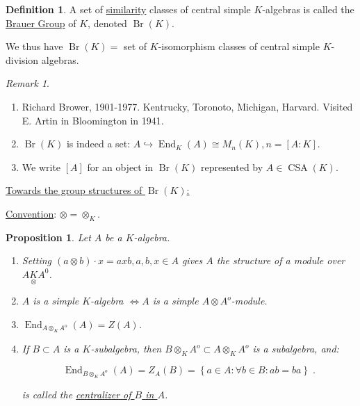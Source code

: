 \documentclass{article}
\theoremstyle{definition}
\newtheorem*{definition}{Definition}
\theoremstyle{plain}
\newtheorem{proposition}[theorem]{Proposition}
\theoremstyle{remark}
\newtheorem*{remark*}{Remark}
\begin{document}
    \begin{definition}
        A set of \underline{similarity} classes of central simple \(K\)-algebras is called the \underline{Brauer Group} of \(K\), denoted \(\operatorname{Br}(K)\).
    \end{definition}

    We thus have \(\operatorname{Br}(K) =\) set of \(K\)-isomorphism classes of central simple \(K\)-division algebras.

    \begin{remark*}

        \begin{enumerate}[label=\arabic*)]
            \item  Richard Brower, 1901-1977. Kentrucky, Toronoto, Michigan, Harvard. Visited E. Artin in Bloomington in 1941.
            \item \(\operatorname{Br}(K)\) is indeed a set: \(A \hookrightarrow \operatorname{End}_K(A) \cong M_n(K), n = [A:K]\).
            \item We write \([A]\) for an object in \(\operatorname{Br}(K)\) represented by \(A\in \operatorname{CSA}(K)\).
        \end{enumerate} 

    \end{remark*}

    \underline{Towards the group structures of \(\operatorname{Br}(K)\):}

    \underline{Convention}: \(\otimes = \otimes_K\).

    \begin{proposition}
        Let \(A\) be a \(K\)-algebra.

        \begin{enumerate}[label=\roman*)]
            \item Setting \((a \otimes b) \cdot x = axb, a,b,x\in A\) gives \(A\) the structure of a module over \(A \underset{\otimes}{K} A^0\).
            \item \(A\) is a simple \(K\)-algebra \(\iff A\) is a simple \(A \otimes A^o\)-module.
            \item \(\operatorname{End}_{A \otimes_K A^o}(A) = Z(A)\).
            \item If \(B \subset A\) is a \(K\)-subalgebra, then \(B \otimes_K A^o \subset A \otimes_K A^o\) is a subalgebra, and:
            
            \[
                \operatorname{End}_{B \otimes_K A^o}(A) = Z_A(B) = \left\{ a\in A : \forall b\in B: ab = ba \right\}\;.
            \]

            is called the \underline{centralizer of \(B\) in \(A\)}.
        \end{enumerate} 
    \end{proposition}
\end{document}
